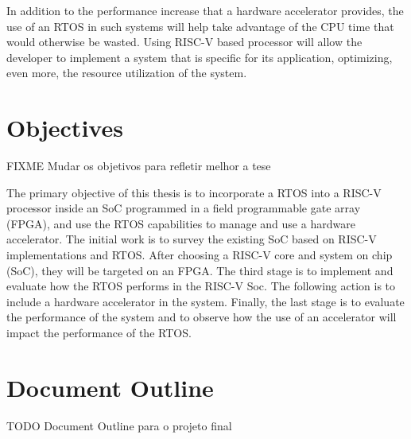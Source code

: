 In addition to the performance increase that a hardware accelerator provides, the use of an RTOS in such systems will help take advantage of the CPU time that would otherwise be wasted. Using RISC-V based processor will allow the developer to implement a system that is specific for its application, optimizing, even more, the resource utilization of the system.


\section{Objectives}
\label{section:objectives}
FIXME Mudar os objetivos para refletir melhor a tese

The primary objective of this thesis is to incorporate a RTOS into a RISC-V processor inside an SoC programmed in a field programmable gate array (FPGA), and use the RTOS capabilities to manage and use a hardware accelerator. The initial work is to survey the existing SoC based on RISC-V implementations and RTOS. After choosing a RISC-V core and system on chip (SoC), they will be targeted on an FPGA. The third stage is to implement and evaluate how the RTOS performs in the RISC-V Soc. The following action is to include a hardware accelerator in the system. Finally, the last stage is to evaluate the performance of the system and to observe how the use of an accelerator will impact the performance of the RTOS.


\section{Document Outline}
TODO Document Outline para o projeto final





